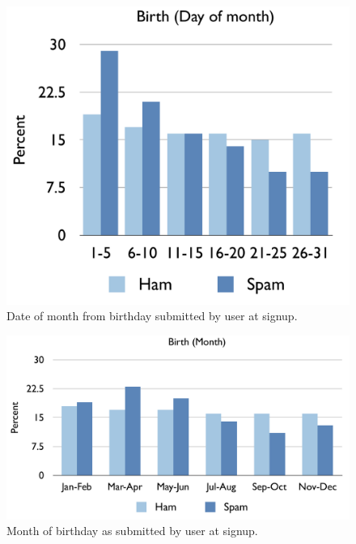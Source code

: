 \documentclass[preprint]{acm_proc_article-sp}
\begin{document}
\begin{figure}[h]
    \centering
    \includegraphics[width=\linewidth]{figures/dob-day.pdf}
    \caption{Date of month from birthday submitted by user at signup.}
    \label{fig:day}
\end{figure}

\begin{figure}[h]
    \centering
    \includegraphics[width=\linewidth]{figures/dob-month.pdf}
    \caption{Month of birthday as submitted by user at signup.}
    \label{fig:month}
\end{figure}
\end{document}

